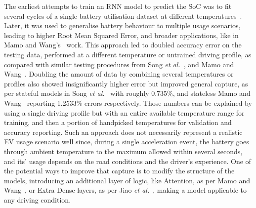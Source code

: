 %
The earliest attempts to train an RNN model to predict the SoC was to fit several cycles of a single battery utilisation dataset at different temperatures~\cite{song_lithium-ion_2018, xiao_accurate_2019,javid_adaptive_2020, jiao_gru-rnn_2020}.
Later, it was used to generalise battery behaviour to multiple usage scenarios, leading to higher Root Mean Squared Error, and broader applications, like in Mamo and Wang's~\cite{mamo_long_2020} work.
This approach led to doubled accuracy error on the testing data, performed at a different temperature or untrained driving profile, as compared with similar testing procedures from Song \textit{et al.}~\cite{song_lithium-ion_2018}, and Mamo and Wang~\cite{mamo_long_2020}.
Doubling the amount of data by combining several temperatures or profiles also showed insignificantly higher error but improved general capture, as per stateful models in Song \textit{et al.}~\cite{song_lithium-ion_2018} with roughly 0.735\%, and stateless Mamo and Wang~\cite{mamo_long_2020} reporting 1.2533\%  errors respectively.
Those numbers can be explained by using a single driving profile but with an entire available temperature range for training, and then a portion of handpicked temperatures for validation and accuracy reporting.
Such an approach does not necessarily represent a realistic EV usage scenario well since, during a single acceleration event, the battery goes through ambient temperature to the maximum allowed within several seconds, and its' usage depends on the road conditions and the driver's experience.
One of the potential ways to improve that capture is to modify the structure of the models, introducing an additional layer of logic, like Attention, as per Mamo and Wang~\cite{mamo_long_2020}, or Extra Dense layers, as per Jiao \textit{et al.}~\cite{jiao_gru-rnn_2020}, making a model applicable to any driving condition.
